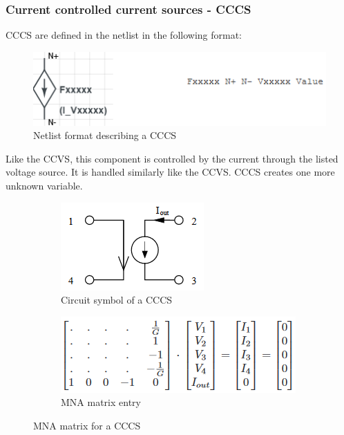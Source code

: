 \documentclass[12pt,a4paper]{article}
\begin{document}
\subsubsection{Current controlled current sources - CCCS}
CCCS are defined in the netlist in the following format: \par
\begin{figure} [h!]
	\centering
	\includegraphics[]{F.png}
	\caption{Netlist format describing a CCCS \cite{MNA}}
\end{figure} 
Like the CCVS, this component is controlled by the current through the listed voltage source. It is handled similarly like the CCVS.
CCCS creates one more unknown variable.
\begin{figure} [h!]
	\centering
	\begin{subfigure}{.5\textwidth}
	  \centering
	  \includegraphics[scale=0.8]{F_diagram.PNG}
	  \caption{Circuit symbol of a CCCS}
	  \label{fig:sub1}
	\end{subfigure}%
	\begin{subfigure}{.5\textwidth}
	  \centering
	  \includegraphics[width= \textwidth]{F_matrices.PNG}
	  \caption{MNA matrix entry}
	  \label{fig:sub2}
	\end{subfigure}
	\caption{MNA matrix for a CCCS \cite{jahn_margraf_habchi_jacob_2003}}
	\label{fig:test}
\end{figure}

\pagebreak
\end{document}
